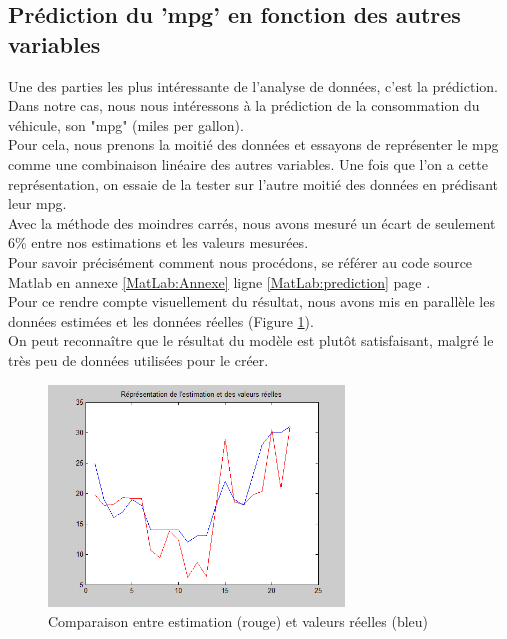 \documentclass[11pt,oneside]{article}
\begin{document}
\subsection{Prédiction du 'mpg' en fonction des autres variables}
Une des parties les plus intéressante de l'analyse de données, c'est la prédiction.\\
Dans notre cas, nous nous intéressons à la prédiction de la consommation du véhicule, son "mpg" (miles per gallon).\\

Pour cela, nous prenons la moitié des données et essayons de représenter le mpg comme une combinaison linéaire des autres variables. Une fois que l'on a cette représentation, on essaie de la tester sur l'autre moitié des données en prédisant leur mpg.\\
Avec la méthode des moindres carrés, nous avons mesuré un écart de seulement 6\% entre nos estimations et les valeurs mesurées.\\

Pour savoir précisément comment nous procédons, se référer au code source Matlab en annexe \ref{MatLab:Annexe} ligne \ref{MatLab:prediction} page \pageref{MatLab:prediction}.\\

Pour ce rendre compte visuellement du résultat, nous avons mis en parallèle les données estimées et les données réelles (Figure \ref{img:estimation}).\\
On peut reconnaître que le résultat du modèle est plutôt satisfaisant, malgré le très peu de données utilisées pour le créer.

\begin{figure}
	\begin{center}
	\includegraphics[width=0.7\textwidth]{Images/Estimation}
	\caption{Comparaison entre estimation (rouge) et valeurs réelles (bleu)}\label{img:estimation}
	  \end{center}
\end{figure}
\FloatBarrier
\end{document}
